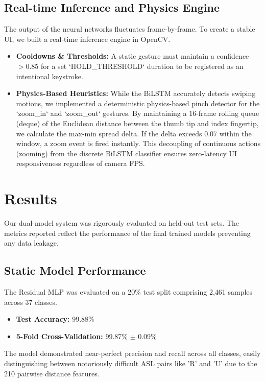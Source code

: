 \documentclass[10pt,twocolumn,letterpaper]{article}
\begin{document}
\subsection{Real-time Inference and Physics Engine}
The output of the neural networks fluctuates frame-by-frame. To create a stable UI, we built a real-time inference engine in OpenCV.
\begin{itemize}
    \item \textbf{Cooldowns \& Thresholds:} A static gesture must maintain a confidence $>0.85$ for a set `HOLD\_THRESHOLD` duration to be registered as an intentional keystroke.
    \item \textbf{Physics-Based Heuristics:} While the BiLSTM accurately detects swiping motions, we implemented a deterministic physics-based pinch detector for the `zoom_in` and `zoom_out` gestures. By maintaining a 16-frame rolling queue (deque) of the Euclidean distance between the thumb tip and index fingertip, we calculate the max-min spread delta. If the delta exceeds 0.07 within the window, a zoom event is fired instantly. This decoupling of continuous actions (zooming) from the discrete BiLSTM classifier ensures zero-latency UI responsiveness regardless of camera FPS.
\end{itemize}


\section{Results}

Our dual-model system was rigorously evaluated on held-out test sets. The metrics reported reflect the performance of the final trained models preventing any data leakage.

\subsection{Static Model Performance}
The Residual MLP was evaluated on a 20\% test split comprising 2,461 samples across 37 classes.
\begin{itemize}
    \item \textbf{Test Accuracy:} 99.88\%
    \item \textbf{5-Fold Cross-Validation:} 99.87\% $\pm$ 0.09\%
\end{itemize}
The model demonstrated near-perfect precision and recall across all classes, easily distinguishing between notoriously difficult ASL pairs like 'R' and 'U' due to the 210 pairwise distance features.
\end{document}
